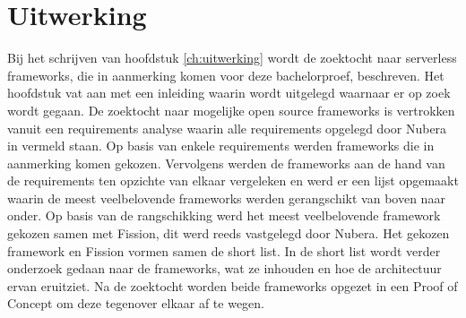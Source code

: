 \section{Uitwerking}
Bij het schrijven van hoofdstuk \ref{ch:uitwerking} wordt de zoektocht naar 
serverless frameworks, die in aanmerking komen voor deze bachelorproef, beschreven. Het hoofdstuk vat aan met een inleiding waarin wordt uitgelegd waarnaar er op zoek wordt gegaan. De zoektocht naar mogelijke open source frameworks is vertrokken vanuit een requirements analyse waarin alle requirements opgelegd door Nubera in vermeld staan. Op basis van enkele requirements werden frameworks die in aanmerking komen gekozen. Vervolgens werden de frameworks aan de hand van de requirements ten opzichte van elkaar vergeleken en werd er een lijst opgemaakt waarin de meest veelbelovende frameworks werden gerangschikt van boven naar onder. Op basis van de rangschikking werd het meest veelbelovende framework gekozen samen met Fission, dit werd reeds vastgelegd door Nubera. Het gekozen framework en Fission vormen samen de short list. In de short list wordt verder onderzoek gedaan naar de frameworks, wat ze inhouden en hoe de architectuur ervan eruitziet. Na de zoektocht worden beide frameworks opgezet in een Proof of Concept om deze tegenover elkaar af te wegen.

